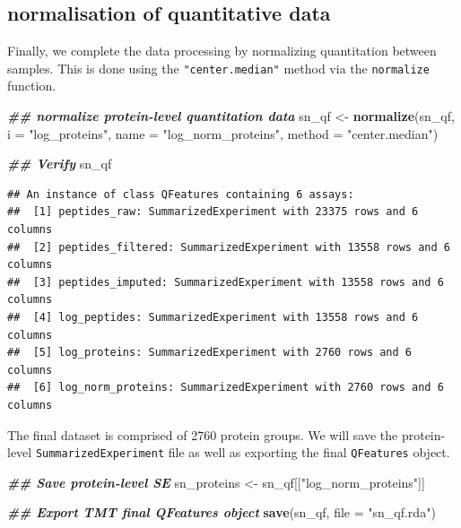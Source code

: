 \documentclass[9pt,a4paper,]{extarticle}
\newenvironment{Shaded}{\begin{snugshade}}{\end{snugshade}}
\newcommand{\AttributeTok}[1]{\textcolor[rgb]{0.13,0.29,0.53}{#1}}
\newcommand{\DocumentationTok}[1]{\textcolor[rgb]{0.56,0.35,0.01}{\textbf{\textit{#1}}}}
\newcommand{\FunctionTok}[1]{\textcolor[rgb]{0.13,0.29,0.53}{\textbf{#1}}}
\newcommand{\NormalTok}[1]{#1}
\newcommand{\OtherTok}[1]{\textcolor[rgb]{0.56,0.35,0.01}{#1}}
\newcommand{\StringTok}[1]{\textcolor[rgb]{0.31,0.60,0.02}{#1}}
\begin{document}
\subsection{normalisation of quantitative data}\label{normalisation-of-quantitative-data-1}

Finally, we complete the data processing by normalizing quantitation between
samples. This is done using the \texttt{"center.median"} method via the \texttt{normalize}
function.

\begin{Shaded}
\begin{Highlighting}[]
\DocumentationTok{\#\# normalize protein{-}level quantitation data}
\NormalTok{sn\_qf }\OtherTok{\textless{}{-}} \FunctionTok{normalize}\NormalTok{(sn\_qf,}
                   \AttributeTok{i =} \StringTok{"log\_proteins"}\NormalTok{,}
                   \AttributeTok{name =} \StringTok{"log\_norm\_proteins"}\NormalTok{,}
                   \AttributeTok{method =} \StringTok{"center.median"}\NormalTok{)}

\DocumentationTok{\#\# Verify}
\NormalTok{sn\_qf}
\end{Highlighting}
\end{Shaded}

\begin{verbatim}
## An instance of class QFeatures containing 6 assays:
##  [1] peptides_raw: SummarizedExperiment with 23375 rows and 6 columns 
##  [2] peptides_filtered: SummarizedExperiment with 13558 rows and 6 columns 
##  [3] peptides_imputed: SummarizedExperiment with 13558 rows and 6 columns 
##  [4] log_peptides: SummarizedExperiment with 13558 rows and 6 columns 
##  [5] log_proteins: SummarizedExperiment with 2760 rows and 6 columns 
##  [6] log_norm_proteins: SummarizedExperiment with 2760 rows and 6 columns
\end{verbatim}

The final dataset is comprised of 2760 protein
groups. We will save the protein-level \texttt{SummarizedExperiment} file as well as
exporting the final \texttt{QFeatures} object.

\begin{Shaded}
\begin{Highlighting}[]
\DocumentationTok{\#\# Save protein{-}level SE}
\NormalTok{sn\_proteins }\OtherTok{\textless{}{-}}\NormalTok{ sn\_qf[[}\StringTok{"log\_norm\_proteins"}\NormalTok{]]}

\DocumentationTok{\#\# Export TMT final QFeatures object}
\FunctionTok{save}\NormalTok{(sn\_qf, }\AttributeTok{file =} \StringTok{"sn\_qf.rda"}\NormalTok{)}
\end{Highlighting}
\end{Shaded}
\end{document}
